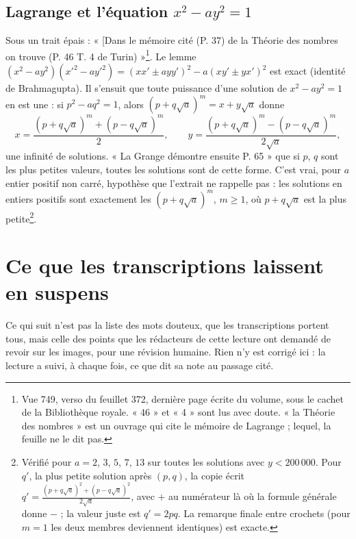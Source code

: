 \documentclass[11pt,a4paper]{article}
\begin{document}
\subsection*{Lagrange et l'équation $x^2 - ay^2 = 1$}

Sous un trait épais : « [Dans le mémoire cité (P. 37) de la Théorie des nombres on trouve (P. 46 T. 4 de Turin) »\footnote{Vue 749, verso du feuillet 372, dernière page écrite du volume, sous le cachet de la Bibliothèque royale. « 46 » et « 4 » sont lus avec doute. « la Théorie des nombres » est un ouvrage qui cite le mémoire de Lagrange ; lequel, la feuille ne le dit pas.}. Le lemme $(x^2-ay^2)(x'^2-ay'^2)=(xx'\pm ayy')^2-a(xy'\pm yx')^2$ est exact (identité de Brahmagupta). Il s'ensuit que toute puissance d'une solution de $x^2-ay^2=1$ en est une : si $p^2-aq^2=1$, alors $(p+q\sqrt a)^m=x+y\sqrt a$ donne
\[ x=\frac{(p+q\sqrt a)^m+(p-q\sqrt a)^m}{2},\qquad y=\frac{(p+q\sqrt a)^m-(p-q\sqrt a)^m}{2\sqrt a}, \]
une infinité de solutions. « La Grange démontre ensuite P. 65 » que si $p$, $q$ sont les plus petites valeurs, toutes les solutions sont de cette forme. C'est vrai, pour $a$ entier positif non carré, hypothèse que l'extrait ne rappelle pas : les solutions en entiers positifs sont exactement les $(p+q\sqrt a)^m$, $m\ge1$, où $p+q\sqrt a$ est la plus petite\footnote{Vérifié pour $a=2$, $3$, $5$, $7$, $13$ sur toutes les solutions avec $y<200\,000$. Pour $q'$, la plus petite solution après $(p,q)$, la copie écrit $q'=\frac{(p+q\sqrt a)^2+(p-q\sqrt a)^2}{2\sqrt a}$, avec $+$ au numérateur là où la formule générale donne $-$ ; la valeur juste est $q'=2pq$. La remarque finale entre crochets (pour $m=1$ les deux membres deviennent identiques) est exacte.}.

\section*{Ce que les transcriptions laissent en suspens}

Ce qui suit n'est pas la liste des mots douteux, que les transcriptions portent
tous, mais celle des points que les rédacteurs de cette lecture ont demandé de
revoir sur les images, pour une révision humaine. Rien n'y est corrigé ici : la
lecture a suivi, à chaque fois, ce que dit sa note au passage cité.
\end{document}
